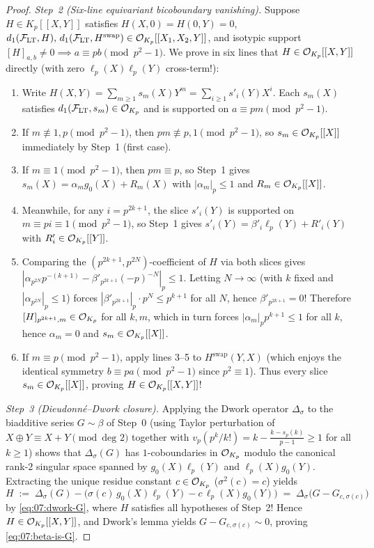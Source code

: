 \begin{proof}
\emph{Step~2 (Six-line equivariant bicoboundary vanishing).}
Suppose $H \in K_p[[X, Y]]$ satisfies $H(X, 0) = H(0, Y) = 0$, $d_1(\mathcal{F}_{\mathrm{LT}}, H),\, d_1(\mathcal{F}_{\mathrm{LT}}, H^{\mathrm{swap}}) \in \mathcal{O}_{K_p}[[X_1, X_2, Y]]$, and isotypic support $[H]_{a,b} \neq 0 \implies a \equiv p b \pmod{p^2 - 1}$. We prove in six lines that $H \in \mathcal{O}_{K_p}[[X, Y]]$ directly (with zero $\ell_p(X)\ell_p(Y)$ cross-term!):
\begin{enumerate}[label=\textup{\arabic*.}]
\item Write $H(X, Y) = \sum_{m \ge 1} s_m(X) Y^m = \sum_{i \ge 1} s'_i(Y) X^i$. Each $s_m(X)$ satisfies $d_1(\mathcal{F}_{\mathrm{LT}}, s_m) \in \mathcal{O}_{K_p}$ and is supported on $a \equiv p m \pmod{p^2 - 1}$.
\item If $m \not\equiv 1, p \pmod{p^2 - 1}$, then $p m \not\equiv p, 1 \pmod{p^2 - 1}$, so $s_m \in \mathcal{O}_{K_p}[[X]]$ immediately by Step~1 (first case).
\item If $m \equiv 1 \pmod{p^2 - 1}$, then $p m \equiv p$, so Step~1 gives $s_m(X) = \alpha_m g_0(X) + R_m(X)$ with $|\alpha_m|_p \le 1$ and $R_m \in \mathcal{O}_{K_p}[[X]]$.
\item Meanwhile, for any $i = p^{2k+1}$, the slice $s'_i(Y)$ is supported on $m \equiv p i \equiv 1 \pmod{p^2 - 1}$, so Step~1 gives $s'_i(Y) = \beta'_i \ell_p(Y) + R'_i(Y)$ with $R'_i \in \mathcal{O}_{K_p}[[Y]]$.
\item Comparing the $(p^{2k+1}, p^{2N})$-coefficient of $H$ via both slices gives $|\alpha_{p^{2N}} p^{-(k+1)} - \beta'_{p^{2k+1}} (-p)^{-N}|_p \le 1$. Letting $N \to \infty$ (with $k$ fixed and $|\alpha_{p^{2N}}|_p \le 1$) forces $|\beta'_{p^{2k+1}}|_p \cdot p^N \le p^{k+1}$ for all $N$, hence $\beta'_{p^{2k+1}} = 0$! Therefore $[H]_{p^{2k+1}, m} \in \mathcal{O}_{K_p}$ for all $k, m$, which in turn forces $|\alpha_m|_p p^{k+1} \le 1$ for all $k$, hence $\alpha_m = 0$ and $s_m \in \mathcal{O}_{K_p}[[X]]$.
\item If $m \equiv p \pmod{p^2 - 1}$, apply lines 3--5 to $H^{\mathrm{swap}}(Y, X)$ (which enjoys the identical symmetry $b \equiv p a \pmod{p^2 - 1}$ since $p^2 \equiv 1$). Thus every slice $s_m \in \mathcal{O}_{K_p}[[X]]$, proving $H \in \mathcal{O}_{K_p}[[X, Y]]$!
\end{enumerate}

\emph{Step~3 (Dieudonné--Dwork closure).}
Applying the Dwork operator $\Delta_\sigma$ to the biadditive series $G \sim \beta$ of Step~0 (using Taylor perturbation of $X \oplus Y \equiv X + Y \pmod{\text{deg } 2}$ together with $v_p(p^k / k!) = k - \frac{k - s_p(k)}{p - 1} \ge 1$ for all $k \ge 1$) shows that $\Delta_\sigma(G)$ has $1$-coboundaries in $\mathcal{O}_{K_p}$ modulo the canonical rank-$2$ singular space spanned by $g_0(X)\ell_p(Y)$ and $\ell_p(X)g_0(Y)$. Extracting the unique residue constant $c \in \mathcal{O}_{K_p}$ ($\sigma^2(c) = c$) yields
\[
  H \;:=\; \Delta_\sigma(G) - \bigl(\sigma(c)\, g_0(X)\ell_p(Y) - c\, \ell_p(X)g_0(Y)\bigr)
  \;=\; \Delta_\sigma\bigl(G - G_{c, \sigma(c)}\bigr)
\]
by \eqref{eq:07:dwork-G}, where $H$ satisfies all hypotheses of Step~2! Hence $H \in \mathcal{O}_{K_p}[[X, Y]]$, and Dwork's lemma yields $G - G_{c, \sigma(c)} \sim 0$, proving \eqref{eq:07:beta-is-G}.
\end{proof}
